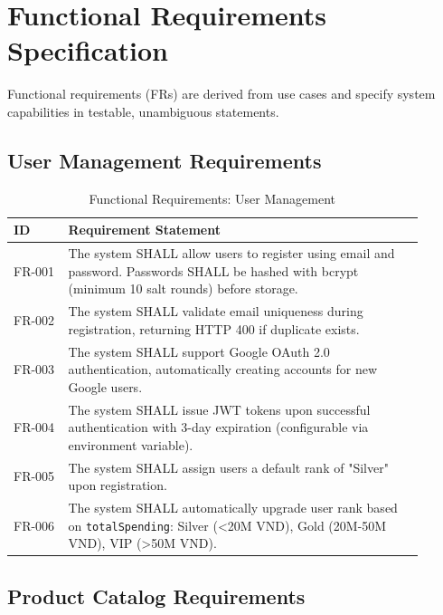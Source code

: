 \documentclass[12pt, a4paper]{report}
\begin{document}
\section{Functional Requirements Specification}

Functional requirements (FRs) are derived from use cases and specify system capabilities in testable, unambiguous statements.

\subsection{User Management Requirements}

\begin{table}[H]
\centering
\caption{Functional Requirements: User Management}
\label{tab:fr_user}
\small
\begin{tabular}{@{}p{0.12\linewidth}p{0.78\linewidth}@{}}
\toprule
\textbf{ID} & \textbf{Requirement Statement} \\
\midrule
FR-001 & The system SHALL allow users to register using email and password. Passwords SHALL be hashed with bcrypt (minimum 10 salt rounds) before storage. \\
FR-002 & The system SHALL validate email uniqueness during registration, returning HTTP 400 if duplicate exists. \\
FR-003 & The system SHALL support Google OAuth 2.0 authentication, automatically creating accounts for new Google users. \\
FR-004 & The system SHALL issue JWT tokens upon successful authentication with 3-day expiration (configurable via environment variable). \\
FR-005 & The system SHALL assign users a default rank of "Silver" upon registration. \\
FR-006 & The system SHALL automatically upgrade user rank based on \texttt{totalSpending}: Silver (\textless 20M VND), Gold (20M-50M VND), VIP (\textgreater 50M VND). \\
\bottomrule
\end{tabular}
\end{table}

\subsection{Product Catalog Requirements}
\end{document}

